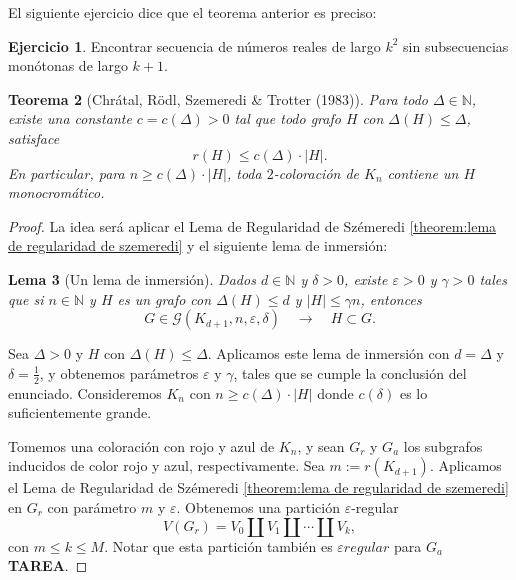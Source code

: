 \documentclass[12pt]{report}
\theoremstyle{plain}
\newtheorem{theorem}{Teorema}[section]
\newtheorem{lemma}[theorem]{Lema}
\theoremstyle{definition}
\newtheorem{exercise}[theorem]{Ejercicio}
\newcommand{\red}[1]{\textcolor{BrickRed}{#1}}
\newcommand{\naturals}{\mathbb{N}}
\newcommand{\abs}[1]{\left \vert #1 \right \vert}
\begin{document}
El siguiente ejercicio dice que el teorema anterior es preciso:
\begin{exercise}
Encontrar secuencia de números reales de largo $k^2$ sin subsecuencias monótonas de largo $k+1$.
\end{exercise}




\begin{theorem}[Chrátal, Rödl, Szemeredi \& Trotter (1983)]
Para todo $\Delta \in \naturals$, existe una constante $c = c(\Delta)>0$ tal que todo grafo $H$ con $\Delta (H) \leq \Delta$, satisface
\[
    r(H) \leq c(\Delta) \cdot \abs H.
\]
En particular, para $n \geq c(\Delta) \cdot \abs H$, toda $2$-coloración de $K_n$ contiene un $H$ monocromático.
\end{theorem}

\begin{proof}
La idea será aplicar el Lema de Regularidad de Szémeredi \ref{theorem:lema de regularidad de szemeredi} y el siguiente lema de inmersión:


\begin{lemma}[Un lema de inmersión]\label{lema:un lema de inmersion para numeros de ramsey}
Dados $d \in \naturals$ y $\delta >0$, existe $\varepsilon > 0$ y $\gamma > 0$ tales que si $n \in \naturals$ y $H$ es un grafo con $\Delta (H) \leq d$ y $\abs H \leq \gamma n$, entonces
\[
    G \in \mathcal G (K_{d+1}, n , \varepsilon , \delta) \quad \longrightarrow \quad H \subset G    .
\]
\end{lemma}

Sea $\Delta > 0$ y $H$ con $\Delta (H) \leq \Delta$. Aplicamos este lema de inmersión con $d = \Delta$ y $\delta = \frac{1 }{2}$, y obtenemos parámetros $\varepsilon$ y $\gamma$, tales que se cumple la conclusión del enunciado. Consideremos $K_n$ con $n \geq c(\Delta) \cdot \abs H$ donde $c(\delta) $ es lo suficientemente grande.

Tomemos una coloración con rojo y azul de $K_n$, y sean $G_r$ y $G_a$ los subgrafos inducidos de color rojo y azul, respectivamente. Sea $m := r(K_{d+1})$. Aplicamos el Lema de Regularidad de Szémeredi \ref{theorem:lema de regularidad de szemeredi} en $G_r$ con parámetro $m$ y $\varepsilon$. Obtenemos una partición $\varepsilon$-regular
\[
    V(G_r) = V_0 \coprod V_1 \coprod \cdots \coprod V_k,
\]
con $m \leq k \leq M$. Notar que esta partición también es $\varepsilon regular$ para $G_a$ \red{\textbf{TAREA}}.


\end{proof}
\end{document}
